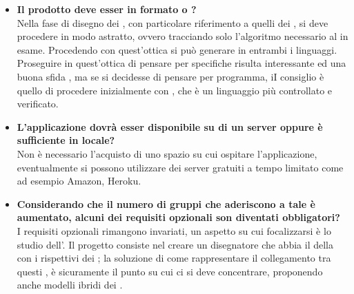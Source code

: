 \begin{itemize}
		   	 \item
	   	 \textbf{Il  prodotto deve esser in formato  o ?\\}
	   	 \justifying
	   	 Nella fase di disegno dei , con particolare riferimento a quelli dei , si deve procedere in modo astratto, ovvero tracciando solo l'algoritmo necessario al  in esame. Procedendo con quest'ottica si può generare  in entrambi i linguaggi. Proseguire in quest'ottica di pensare per specifiche risulta interessante ed una buona sfida , ma se si decidesse di pensare per programma, iI consiglio è quello di procedere inizialmente con , che è un linguaggio più controllato e verificato.\\
		
		   	 \item
	   	 \textbf{L'applicazione dovrà esser disponibile su di un server oppure è sufficiente in locale?\\}
	   	\justifying
	   	 Non è necessario l'acquisto di uno spazio su cui ospitare l'applicazione, eventualmente si possono utilizzare dei server gratuiti a tempo limitato come ad esempio Amazon, Heroku.\\
		
		\item
	   	 \textbf{Considerando che il numero di gruppi che aderiscono a tale  è aumentato, alcuni dei requisiti opzionali son diventati obbligatori?\\}
	   	\justifying
	   	I requisiti opzionali rimangono invariati, un aspetto su cui focalizzarsi è lo studio dell'. Il progetto consiste nel creare un disegnatore che abbia il  della  con i rispettivi  dei ; la soluzione di come rappresentare il collegamento tra questi , è sicuramente il punto su cui ci si deve concentrare, proponendo anche modelli ibridi dei .\\
	   	 

\end{itemize}
